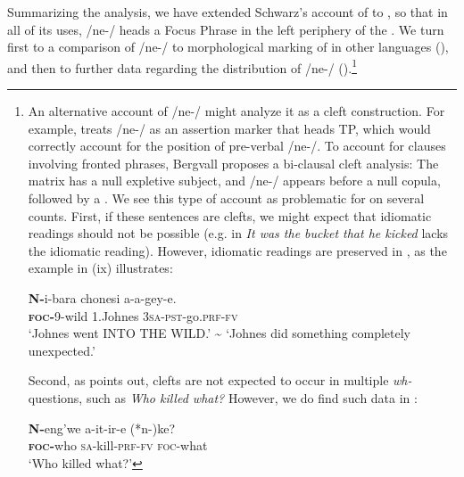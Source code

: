 \documentclass[output=paper,modfonts]{langscibook}
\begin{document}
Summarizing the analysis, we have extended Schwarz's account of  to , so that in all of its uses, /ne-/ heads a Focus Phrase in the left periphery of the .   We turn first to a comparison of /ne-/ to morphological marking of  in other languages (), and then to further data regarding the distribution of /ne-/ ().\footnote{{An 
  alternative account of /ne-/ might analyze it as a cleft construction. For example, \citet{Bergvall1987} treats  /ne-/ as an assertion marker that heads TP, which would correctly account for the position of pre-verbal /ne-/. To account for clauses involving fronted phrases, Bergvall proposes a bi-clausal cleft analysis: The matrix  has a null expletive subject, and /ne-/ appears before a null copula, followed by a . We see this type of account as problematic for  on several counts. First, if these sentences are clefts, we might expect that idiomatic readings should not be possible (e.g. in  \textit{It was the bucket that he kicked} lacks the idiomatic reading). However, idiomatic readings are preserved in , as the example in (ix) illustrates:}

  \ea
  \gll \textbf{N-}i-bara chonesi a-a-gey-e.\\
  \textsc{\textbf{foc-}}9-wild 1.Johnes \textsc{3sa}-\textsc{pst}-go.\textsc{prf}-\textsc{fv}\\
  \glt ‘Johnes went INTO THE WILD.’ {\textasciitilde} ‘Johnes did something completely unexpected.’
  \z

  Second, as \citet{Schwarz2007} points out, clefts are not expected to occur in multiple \textit{wh-}questions, such as \textit{Who killed what?} However, we do find such data in :

  \ea 
  \gll \textbf{N-}eng’we a-it-ir-e (*n-)ke?\\
  \textsc{\textbf{foc-}}who \textsc{sa}-kill-\textsc{prf}-\textsc{fv} \textsc{foc}\textsc{-}what\\
  \glt ‘Who killed what?’
  \z

}
\end{document}
